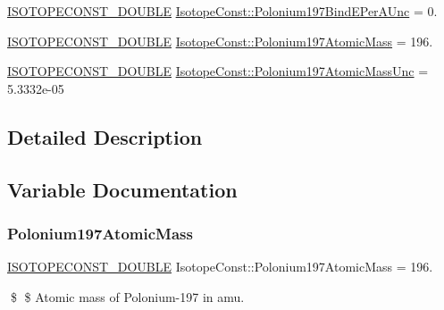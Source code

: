 \begin{DoxyCompactItemize}
\mbox{\hyperlink{group___isotope_const-_macros_ga8f45a7272ce02c0b4c65c44636ed719a}{I\+S\+O\+T\+O\+P\+E\+C\+O\+N\+S\+T\+\_\+\+D\+O\+U\+B\+LE}} \mbox{\hyperlink{group___isotope_const-_polonium-_po197_gaa9d8b80581aa8f99c032097ef113b03a}{Isotope\+Const\+::\+Polonium197\+Bind\+E\+Per\+A\+Unc}} = 0.
\item 
\mbox{\hyperlink{group___isotope_const-_macros_ga8f45a7272ce02c0b4c65c44636ed719a}{I\+S\+O\+T\+O\+P\+E\+C\+O\+N\+S\+T\+\_\+\+D\+O\+U\+B\+LE}} \mbox{\hyperlink{group___isotope_const-_polonium-_po197_ga948f294f41863236bd45ca1e3f211a2e}{Isotope\+Const\+::\+Polonium197\+Atomic\+Mass}} = 196.
\item 
\mbox{\hyperlink{group___isotope_const-_macros_ga8f45a7272ce02c0b4c65c44636ed719a}{I\+S\+O\+T\+O\+P\+E\+C\+O\+N\+S\+T\+\_\+\+D\+O\+U\+B\+LE}} \mbox{\hyperlink{group___isotope_const-_polonium-_po197_gafcde630fa7e73dd3d6bc7286de5fe22b}{Isotope\+Const\+::\+Polonium197\+Atomic\+Mass\+Unc}} = 5.\+3332e-\/05
\end{DoxyCompactItemize}


\subsection{Detailed Description}


\subsection{Variable Documentation}
\mbox{\label{group___isotope_const-_polonium-_po197_ga948f294f41863236bd45ca1e3f211a2e}} 
\subsubsection{\texorpdfstring{Polonium197\+Atomic\+Mass}{Polonium197AtomicMass}}
{\footnotesize\ttfamily \mbox{\hyperlink{group___isotope_const-_macros_ga8f45a7272ce02c0b4c65c44636ed719a}{I\+S\+O\+T\+O\+P\+E\+C\+O\+N\+S\+T\+\_\+\+D\+O\+U\+B\+LE}} Isotope\+Const\+::\+Polonium197\+Atomic\+Mass = 196.}

\$ \$ Atomic mass of Polonium-\/197 in amu. \mbox{\label{group___isotope_const-_polonium-_po197_gafcde630fa7e73dd3d6bc7286de5fe22b}} 
